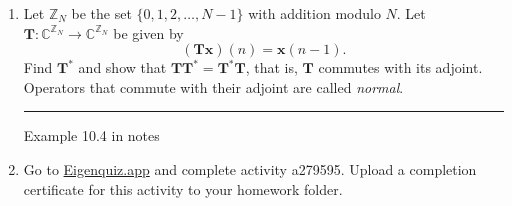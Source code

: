 \documentclass[12pt]{amsart}
\newcommand{\1}{\mathbbm{1}}
\numberwithin{equation}{section}
\numberwithin{Theorem}{section}
\theoremstyle{plain} %
\theoremstyle{definition}
\theoremstyle{remark}
\begin{document}
\begin{enumerate}[1.]
\hrule
\bigskip




\item Let \(\mathbb{Z}_{N}\) be the set \(\{0,1,2,\ldots,N-1\}\) with addition modulo \(N\). Let \(\mathbf{T}:\mathbb{C}^{\mathbb{Z}_{N}}\to\mathbb{C}^{\mathbb{Z}_{N}}\) be given by \[(\mathbf{Tx})(n) = \mathbf{x}(n-1).\]
Find \(\mathbf{T}^{\ast}\) and show that \(\mathbf{TT}^{\ast}=\mathbf{T}^{\ast}\mathbf{T}\), that is, \(\mathbf{T}\) commutes with its adjoint. Operators that commute with their adjoint are called \textit{normal}.\bigskip

\hrule
\bigskip

Example 10.4 in notes



\vspace{\fill}

\item Go to \href{https://eigenquiz.app/}{Eigenquiz.app} and complete activity a279595. Upload a completion certificate for this activity to your homework folder.

\end{enumerate}
\end{document}
